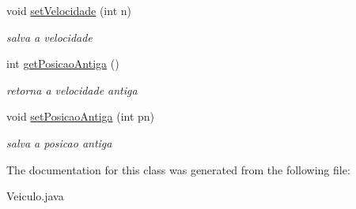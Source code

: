 \begin{DoxyCompactItemize}
void \mbox{\hyperlink{classcom_1_1company_1_1_veiculo_a1e5cd5adf67832f217eb08b500a4a272}{set\+Velocidade}} (int n)
\begin{DoxyCompactList}\small\item\em salva a velocidade \end{DoxyCompactList}\item 
\mbox{\label{classcom_1_1company_1_1_veiculo_ac5031ed15eb034d06b31887f0965d690}} 
int \mbox{\hyperlink{classcom_1_1company_1_1_veiculo_ac5031ed15eb034d06b31887f0965d690}{get\+Posicao\+Antiga}} ()
\begin{DoxyCompactList}\small\item\em retorna a velocidade antiga \end{DoxyCompactList}\item 
\mbox{\label{classcom_1_1company_1_1_veiculo_a01b02131f3f6956622443c9ae7e47e6e}} 
void \mbox{\hyperlink{classcom_1_1company_1_1_veiculo_a01b02131f3f6956622443c9ae7e47e6e}{set\+Posicao\+Antiga}} (int pn)
\begin{DoxyCompactList}\small\item\em salva a posicao antiga \end{DoxyCompactList}\end{DoxyCompactItemize}


The documentation for this class was generated from the following file\+:\begin{DoxyCompactItemize}
\item 
Veiculo.\+java\end{DoxyCompactItemize}
